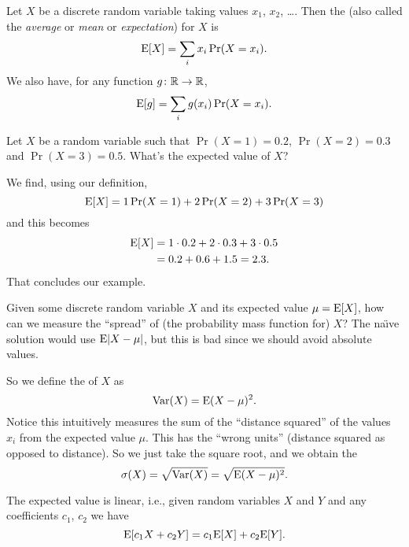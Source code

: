 Let $X$ be a discrete random variable taking values $x_{1}$, $x_{2}$, \dots. 
Then the  (also called the \emph{average} or 
\emph{mean} or \emph{expectation}) for $X$ is
\begin{equation}
\mathrm{E}[X] = \sum_{i}x_{i}\mathop{\mathrm{Pr}}\nolimits(X=x_{i}).
\end{equation}
We also have, for any function $g\colon\mathbb{R}\to\mathbb{R}$,
\begin{equation}
\mathrm{E}[g]=\sum_{i}g(x_{i})\mathop{\mathrm{Pr}}\nolimits(X=x_{i}).
\end{equation}

Let $X$ be a random variable such that $\Pr(X=1)=0.2$, $\Pr(X=2)=0.3$ and $\Pr(X=3)=0.5$. What's the expected value of $X$?

We find, using our definition,
\begin{equation}
\mathrm{E}[X]=1\mathop{\mathrm{Pr}}\nolimits(X=1)+2\mathop{\mathrm{Pr}}\nolimits(X=2)+3\mathop{\mathrm{Pr}}\nolimits(X=3)
\end{equation}
and this becomes
\begin{equation}
\begin{split}
\mathrm{E}[X]&=1\cdot0.2+2\cdot0.3+3\cdot0.5\\
&=0.2+0.6+1.5=2.3.
\end{split}
\end{equation}
That concludes our example.

\M\label{defn:variance}
Given some discrete random variable $X$ and its expected value 
$\mu=\mathrm{E}[X]$, how can we measure the ``spread'' of (the probability 
mass function for) $X$? The na\"{\i}ve solution would use $\mathrm{E}|X-\mu|$, 
but this is bad since we should avoid absolute values.

So we define the  of $X$ as
\begin{equation}
\mathop{\mathrm{Var}}\nolimits(X)=\mathrm{E}(X-\mu)^{2}.
\end{equation}
Notice this intuitively measures the sum of the ``distance squared'' of the 
values $x_i$ from the expected value $\mu$. This has the ``wrong units'' 
(distance squared as opposed to distance). So we just take the square root,
and we obtain the 
\begin{equation}
\sigma(X)=\sqrt{\mathop{\mathrm{Var}}\nolimits(X)}=\sqrt{\mathrm{E}(X-\mu)^{2}}.
\end{equation}

The expected value is linear, i.e., given random variables $X$ and $Y$ and any coefficients $c_1$, $c_2$ we have
\begin{equation}
\mathrm{E}[c_1 X+c_2Y]=c_1\mathrm{E}[X]+c_2\mathrm{E}[Y].
\end{equation}

